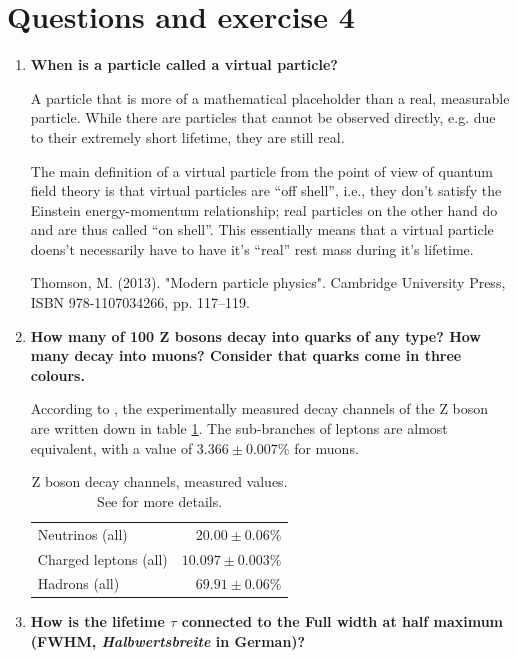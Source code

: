 \documentclass[a4paper,10pt]{article}
\begin{document}
\section{Questions and exercise 4}
\begin{enumerate}
\item \textbf{When is a particle called a virtual particle?}

A particle that is more of a mathematical placeholder than a real, measurable particle. While there are particles that cannot be observed directly, e.g. due to their extremely short lifetime, they are still real. 

The main definition of a virtual particle from the point of view of quantum field theory is that virtual particles are ``off shell'', i.e., they don't satisfy the Einstein energy-momentum relationship; real particles on the other hand do and are thus called ``on shell''. This essentially means that a virtual particle doens't necessarily have to have it's ``real'' rest mass during it's lifetime.

 Thomson, M. (2013). "Modern particle physics". Cambridge University Press, ISBN 978-1107034266, pp. 117–119.
\item \textbf{How many of 100 Z bosons decay into quarks of any type? How many decay into muons? Consider that quarks come in three colours.}

According to \cite{Zdecay}, the experimentally measured decay channels of the Z boson are written down in table \ref{tab:z_boson_decays}. The sub-branches of leptons are almost equivalent, with a value of $3.366 \pm 0.007 \%$ for muons.

\begin{table}
\centering
    \begin{tabular}{l|r}
    \hline
    Neutrinos (all)       & $20.00 \pm 0.06 \%$   \\
    Charged leptons (all) & $10.097 \pm 0.003 \%$ \\
    Hadrons (all)         & $69.91 \pm 0.06 \%$   \\ \hline
    \end{tabular}
    \caption{Z boson decay channels, measured values. See \cite{XXX} for more details.}
    \label{tab:z_boson_decays}
\end{table}
 
\item \textbf{How is the lifetime $\tau$ connected to the Full width at half maximum (FWHM, \textit{Halbwertsbreite} in German)?}


\end{enumerate}
\end{document}
